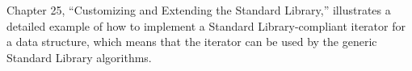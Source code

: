 
Chapter 25, “Customizing and Extending the Standard Library,” illustrates a detailed example of how to implement a Standard Library-compliant iterator for a data structure, which means that the iterator can be used by the generic Standard Library algorithms.





































